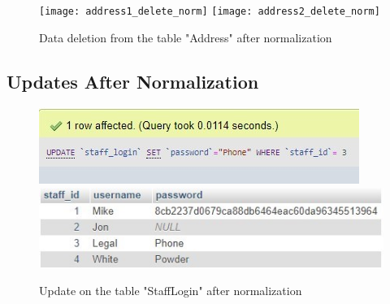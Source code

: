 \documentclass{article}
\begin{document}
		\begin{figure}[H]
			\texttt{[image: address1\_delete\_norm]}
			\texttt{[image: address2\_delete\_norm]}
			\caption{Data deletion from the table "Address" after normalization}
		\end{figure}

	\subsection{Updates After Normalization}
		\begin{figure}[H]
			\includegraphics[width=\textwidth]{stafflogin1_update_norm}
			\includegraphics[width=\textwidth]{stafflogin2_update_norm}
			\caption{Update on the table "Staff\textunderscore Login" after normalization}
		\end{figure}
\end{document}
